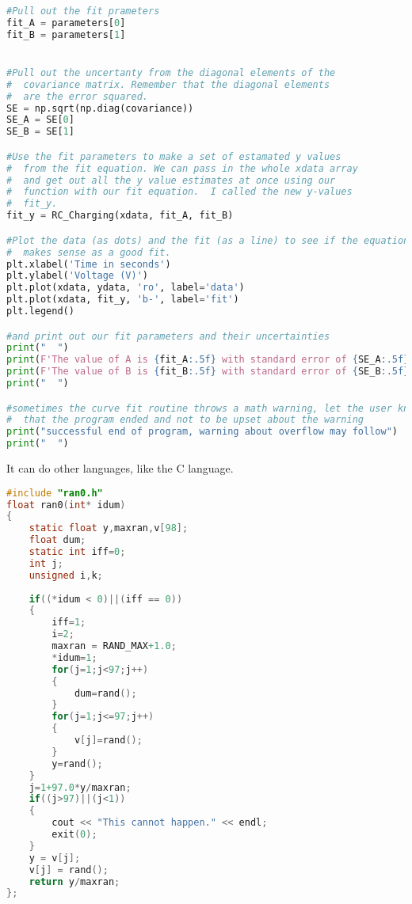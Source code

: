 \begin{lstlisting}[language=Python]
#Pull out the fit prameters
fit_A = parameters[0]
fit_B = parameters[1]


#Pull out the uncertanty from the diagonal elements of the 
#  covariance matrix. Remember that the diagonal elements 
#  are the error squared.
SE = np.sqrt(np.diag(covariance))
SE_A = SE[0]
SE_B = SE[1]

#Use the fit parameters to make a set of estamated y values 
#  from the fit equation. We can pass in the whole xdata array
#  and get out all the y value estimates at once using our 
#  function with our fit equation.  I called the new y-values
#  fit_y.
fit_y = RC_Charging(xdata, fit_A, fit_B)

#Plot the data (as dots) and the fit (as a line) to see if the equation
#  makes sense as a good fit.
plt.xlabel('Time in seconds')
plt.ylabel('Voltage (V)')
plt.plot(xdata, ydata, 'ro', label='data')
plt.plot(xdata, fit_y, 'b-', label='fit')
plt.legend()

#and print out our fit parameters and their uncertainties
print("  ")
print(F'The value of A is {fit_A:.5f} with standard error of {SE_A:.5f}.')
print(F'The value of B is {fit_B:.5f} with standard error of {SE_B:.5f}.')
print("  ")

#sometimes the curve fit routine throws a math warning, let the user know 
#  that the program ended and not to be upset about the warning
print("successful end of program, warning about overflow may follow")
print("  ")
\end{lstlisting}
\normalsize
It can do other languages, like the C language.

\small
\begin{lstlisting}[language=C] 
#include "ran0.h"
float ran0(int* idum)
{
	static float y,maxran,v[98];
	float dum;
	static int iff=0;
	int j;
	unsigned i,k;
	
	if((*idum < 0)||(iff == 0))
	{
		iff=1;
		i=2;
		maxran = RAND_MAX+1.0;
		*idum=1;
		for(j=1;j<97;j++)
		{
			dum=rand();
		}
		for(j=1;j<=97;j++)
		{
			v[j]=rand();
		}
		y=rand();
	}
	j=1+97.0*y/maxran;
	if((j>97)||(j<1))
	{
		cout << "This cannot happen." << endl;
		exit(0);
	}
	y = v[j];
	v[j] = rand();
	return y/maxran;
};
\end{lstlisting}
\normalsize

